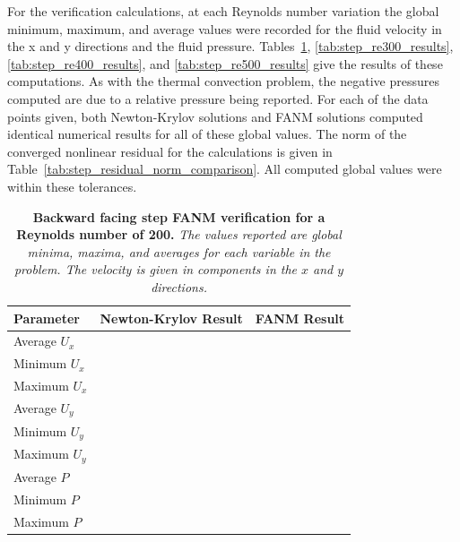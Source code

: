 For the verification calculations, at each Reynolds number variation
the global minimum, maximum, and average values were recorded for the
fluid velocity in the x and y directions and the fluid
pressure. Tables~\ref{tab:step_re200_results},
\ref{tab:step_re300_results}, \ref{tab:step_re400_results}, and
\ref{tab:step_re500_results} give the results of these
computations. As with the thermal convection problem, the negative
pressures computed are due to a relative pressure being reported. For
each of the data points given, both Newton-Krylov solutions and FANM
solutions computed identical numerical results for all of these global
values. The norm of the converged nonlinear residual for the
calculations is given in
Table~\ref{tab:step_residual_norm_comparison}. All computed global
values were within these tolerances.

\begin{table}[h!]
  \begin{center}
    \begin{tabular}{lll}\hline\hline
      \multicolumn{1}{l}{Parameter}& 
      \multicolumn{1}{l}{Newton-Krylov Result}&
      \multicolumn{1}{l}{FANM Result}\\
      \hline
      Average $U_x$ & \\
      Minimum $U_x$ & \\ 
      Maximum $U_x$ & \\
      \hline
      Average $U_y$ & \\
      Minimum $U_y$ & \\ 
      Maximum $U_y$ & \\ 
      \hline
      Average $P$ & \\ 
      Minimum $P$ & \\ 
      Maximum $P$ & \\ 
      \hline\hline
    \end{tabular}
  \end{center}
  \caption{\textbf{Backward facing step FANM verification for a
      Reynolds number of 200.} \textit{The values reported are global
      minima, maxima, and averages for each variable in the
      problem. The velocity is given in components in the $x$ and $y$
      directions.}}
  \label{tab:step_re200_results}
\end{table}

